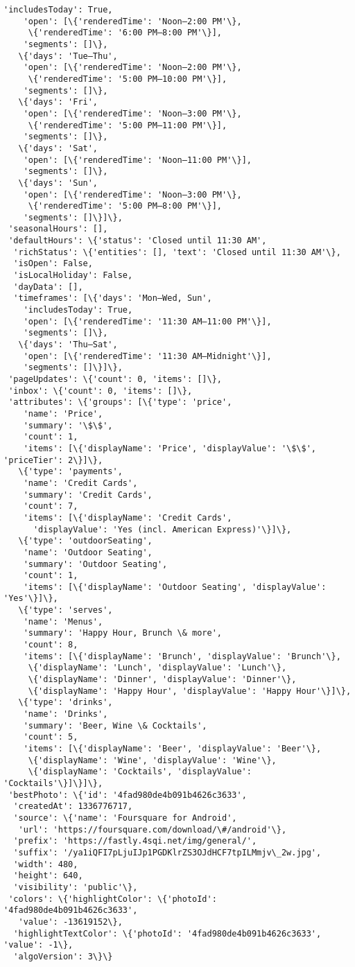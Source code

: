 \documentclass[11pt]{article}
\begin{document}
\begin{tcolorbox}[breakable, size=fbox, boxrule=.5pt, pad at break*=1mm, opacityfill=0]
\begin{Verbatim}[commandchars=\\\{\}]
    'includesToday': True,
    'open': [\{'renderedTime': 'Noon–2:00 PM'\},
     \{'renderedTime': '6:00 PM–8:00 PM'\}],
    'segments': []\},
   \{'days': 'Tue–Thu',
    'open': [\{'renderedTime': 'Noon–2:00 PM'\},
     \{'renderedTime': '5:00 PM–10:00 PM'\}],
    'segments': []\},
   \{'days': 'Fri',
    'open': [\{'renderedTime': 'Noon–3:00 PM'\},
     \{'renderedTime': '5:00 PM–11:00 PM'\}],
    'segments': []\},
   \{'days': 'Sat',
    'open': [\{'renderedTime': 'Noon–11:00 PM'\}],
    'segments': []\},
   \{'days': 'Sun',
    'open': [\{'renderedTime': 'Noon–3:00 PM'\},
     \{'renderedTime': '5:00 PM–8:00 PM'\}],
    'segments': []\}]\},
 'seasonalHours': [],
 'defaultHours': \{'status': 'Closed until 11:30 AM',
  'richStatus': \{'entities': [], 'text': 'Closed until 11:30 AM'\},
  'isOpen': False,
  'isLocalHoliday': False,
  'dayData': [],
  'timeframes': [\{'days': 'Mon–Wed, Sun',
    'includesToday': True,
    'open': [\{'renderedTime': '11:30 AM–11:00 PM'\}],
    'segments': []\},
   \{'days': 'Thu–Sat',
    'open': [\{'renderedTime': '11:30 AM–Midnight'\}],
    'segments': []\}]\},
 'pageUpdates': \{'count': 0, 'items': []\},
 'inbox': \{'count': 0, 'items': []\},
 'attributes': \{'groups': [\{'type': 'price',
    'name': 'Price',
    'summary': '\$\$',
    'count': 1,
    'items': [\{'displayName': 'Price', 'displayValue': '\$\$', 'priceTier': 2\}]\},
   \{'type': 'payments',
    'name': 'Credit Cards',
    'summary': 'Credit Cards',
    'count': 7,
    'items': [\{'displayName': 'Credit Cards',
      'displayValue': 'Yes (incl. American Express)'\}]\},
   \{'type': 'outdoorSeating',
    'name': 'Outdoor Seating',
    'summary': 'Outdoor Seating',
    'count': 1,
    'items': [\{'displayName': 'Outdoor Seating', 'displayValue': 'Yes'\}]\},
   \{'type': 'serves',
    'name': 'Menus',
    'summary': 'Happy Hour, Brunch \& more',
    'count': 8,
    'items': [\{'displayName': 'Brunch', 'displayValue': 'Brunch'\},
     \{'displayName': 'Lunch', 'displayValue': 'Lunch'\},
     \{'displayName': 'Dinner', 'displayValue': 'Dinner'\},
     \{'displayName': 'Happy Hour', 'displayValue': 'Happy Hour'\}]\},
   \{'type': 'drinks',
    'name': 'Drinks',
    'summary': 'Beer, Wine \& Cocktails',
    'count': 5,
    'items': [\{'displayName': 'Beer', 'displayValue': 'Beer'\},
     \{'displayName': 'Wine', 'displayValue': 'Wine'\},
     \{'displayName': 'Cocktails', 'displayValue': 'Cocktails'\}]\}]\},
 'bestPhoto': \{'id': '4fad980de4b091b4626c3633',
  'createdAt': 1336776717,
  'source': \{'name': 'Foursquare for Android',
   'url': 'https://foursquare.com/download/\#/android'\},
  'prefix': 'https://fastly.4sqi.net/img/general/',
  'suffix': '/ya1iQFI7pLjuIJp1PGDKlrZS3OJdHCF7tpILMmjv\_2w.jpg',
  'width': 480,
  'height': 640,
  'visibility': 'public'\},
 'colors': \{'highlightColor': \{'photoId': '4fad980de4b091b4626c3633',
   'value': -13619152\},
  'highlightTextColor': \{'photoId': '4fad980de4b091b4626c3633', 'value': -1\},
  'algoVersion': 3\}\}
\end{Verbatim}
\end{tcolorbox}
        
\end{document}
